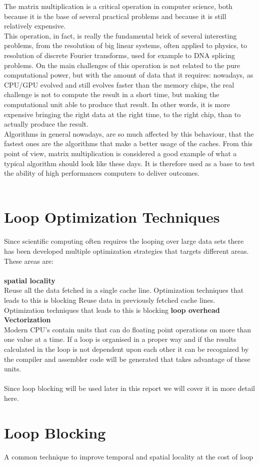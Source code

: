 The matrix multiplication is a critical operation in computer science, both because it is the base of several practical problems and because it is still relatively expensive. \\
This operation, in fact, is really the fundamental brick of several interesting problems, from the resolution of big linear systems, often applied to physics, to resolution of discrete Fourier transforms, used for example to DNA splicing problems.
On the main challenges of this operation is not related to the pure computational power, but with the amount of data that it requires: nowadays, as CPU/GPU evolved and still evolves faster than the memory chips, the real challenge is not to compute the result in a short time, but making the computational unit able to produce that result. In other words, it is more expensive bringing the right data at the right time, to the right chip, than to actually produce the result. \\
Algorithms in general nowadays, are so much affected by this behaviour, that the fastest ones are the algorithms that make a better usage of the caches.
From this point of view, matrix multiplication is considered a good example of what a typical algorithm should look like these days. It is therefore used as a base to test the ability of high performances computers to deliver outcomes. 
\\\\
\section{Loop Optimization Techniques}
Since scientific computing often requires the looping over large data sets there has been developed multiple optimization strategies that targets different areas. These areas are:
\\\\
\textbf{spatial locality}\\
Reuse all the data fetched in a single cache line. Optimization techniques that leads to this is blocking
Reuse data in previously fetched cache lines. Optimization techniques that leads to this is blocking
\textbf{loop overhead}\\ 

\textbf{Vectorization}\\
Modern CPU's contain units that can do floating point operations on more than one value at a time. If a loop is organised in a proper way and if the results calculated in the loop is not dependent upon each other it can be recognized by the compiler and assembler code will be generated that takes advantage of these units.
\\\\
Since loop blocking will be used later in this report we will cover it in more detail here.
\section{Loop Blocking}
A common technique to improve temporal and spatial locality at the cost of loop  


